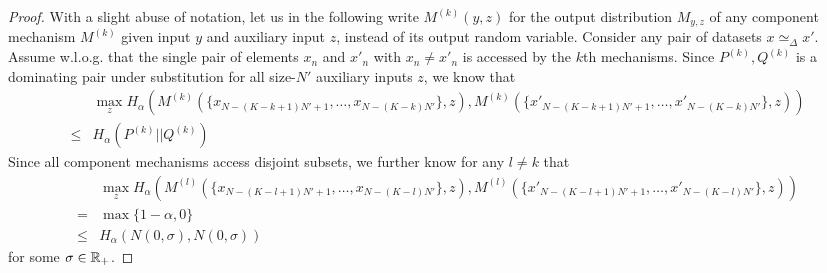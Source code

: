 \begin{proof}
    With a slight abuse of notation, let us in the following write $M^{(k)}(y, z)$ for the output  distribution $M_{y,z}$ of any component mechanism $M^{(k)}$ given input $y$ and auxiliary input $z$, instead of its output random variable.
    Consider any pair of datasets $x \simeq_\Delta x'$. 
    Assume w.l.o.g. that the single pair of elements $x_n$ and $x'_n$ with $x_n \neq x'_n$ is accessed by the $k$th mechanisms.
    Since $P^{(k)}, Q^{(k)}$ is a dominating pair under substitution for all size-$N'$ auxiliary inputs $z$, we know that
    \begin{align*}
        &
        \max_z
         H_\alpha\left(
            M^{(k)}(\{x_{N - (K-k +1) N' + 1},\dots, x_{N - (K-k)N'}\}, z),
            M^{(k)}(\{x'_{N - (K-k +1) N' + 1},\dots, x'_{N - (K-k)N'}\}, z)
        \right)
        \\
        \leq
        &
        H_\alpha(P^{(k)} || Q^{(k)})
    \end{align*}
    Since all component mechanisms access disjoint subsets, we further  know for any $l \neq k$ that
    \begin{align*}
        &
        \max_z
         H_\alpha\left(
            M^{(l)}(\{x_{N - (K-l +1) N' + 1},\dots, x_{N - (K-l)N'}\}, z),
            M^{(l)}(\{x'_{N - (K-l +1) N' + 1},\dots, x'_{N - (K-l)N'}\}, z)
        \right)
        \\
        = 
        & 
        \max \{ 1 - \alpha, 0 \}
        \\
        \leq 
        & 
        H_\alpha(N(0,\sigma),N(0,\sigma)) 
    \end{align*}
    for some $\sigma \in {\mathbb{R}}_+$.


\end{proof}
